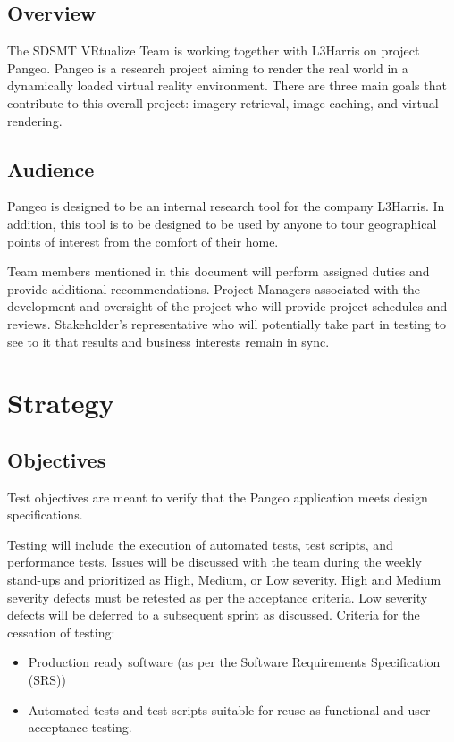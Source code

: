 \documentclass[letterpaper,10pt,english]{sphinxmanual}
\begin{document}
\subsection{Overview}
\label{\detokenize{test_plan/intro:overview}}
The SDSMT VRtualize Team is working together with L3Harris on project Pangeo. Pangeo is a research project aiming to render the real world in a dynamically loaded virtual reality environment. There are three main goals that contribute to this overall project: imagery retrieval, image caching, and virtual rendering.


\subsection{Audience}
\label{\detokenize{test_plan/intro:audience}}
Pangeo is designed to be an internal research tool for the company L3Harris. In addition, this tool  is to be designed to be used by anyone to tour geographical points of interest from the comfort of their home.

Team members mentioned in this document will perform assigned duties and provide additional recommendations. Project Managers associated with the development and oversight of the project who will provide project schedules and reviews. Stakeholder’s representative who will potentially take part in testing to see to it that results and business interests remain in sync.


\section{Strategy}
\label{\detokenize{test_plan/strategy:strategy}}\label{\detokenize{test_plan/strategy::doc}}

\subsection{Objectives}
\label{\detokenize{test_plan/strategy:objectives}}
Test objectives are meant to verify that the Pangeo application meets design specifications.

Testing will include the execution of automated tests, test scripts, and performance tests.  Issues will be discussed with the team during the weekly stand-ups and prioritized as High, Medium, or Low severity.  High and Medium severity defects must be retested as per the acceptance criteria.  Low severity defects will be deferred to a subsequent sprint as discussed.
Criteria for the cessation of testing:
\begin{itemize}
\item {} 
Production ready  software (as per the Software Requirements Specification (SRS))

\item {} 
Automated tests and test scripts suitable for reuse as functional and user-acceptance testing.

\end{itemize}
\end{document}

